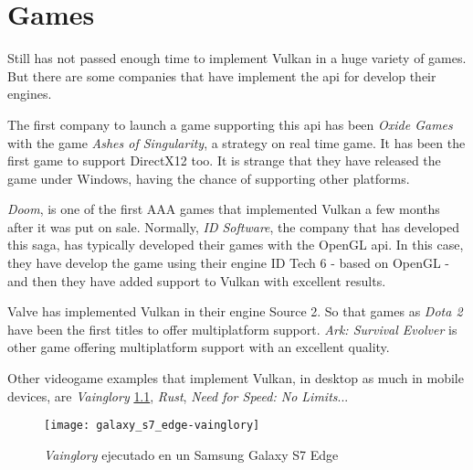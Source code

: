 \chapter{Games}
Still has not passed enough time to implement Vulkan in a huge variety of games. But there are some companies that
have implement the \gls{api} for develop their engines.

The first company to launch a game supporting this \gls{api} has been \emph{Oxide Games} with the game \emph{Ashes of
Singularity}, a strategy on real time game. It has been the first game to support DirectX12 too. It is strange that
they have released the game under Windows, having the chance of supporting other platforms.

\emph{Doom}, is one of the first AAA games that implemented Vulkan a few months after it was put on sale. Normally,
\emph{ID Software}, the company that has developed this saga, has typically developed their games with the OpenGL
\gls{api}. In this case, they have develop the game using their engine ID Tech 6 - based on OpenGL - and then they
have added support to Vulkan with excellent results.

Valve has implemented Vulkan in their engine Source 2. So that games as \emph{Dota 2} have been the first titles to
offer multiplatform support. \emph{Ark: Survival Evolver} is other game offering multiplatform support with an
excellent quality.

Other videogame examples that implement Vulkan, in desktop as much in mobile devices, are \emph{Vainglory}
\ref{fig:vainglory}, \emph{Rust}, \emph{Need for Speed: No Limits}...

\begin{figure}[t]
	\begin{center}
		\texttt{[image: galaxy\_s7\_edge-vainglory]}
		\caption{\emph{Vainglory} ejecutado en un Samsung Galaxy S7 Edge}
		\label{fig:vainglory}
	\end{center}
\end{figure}
